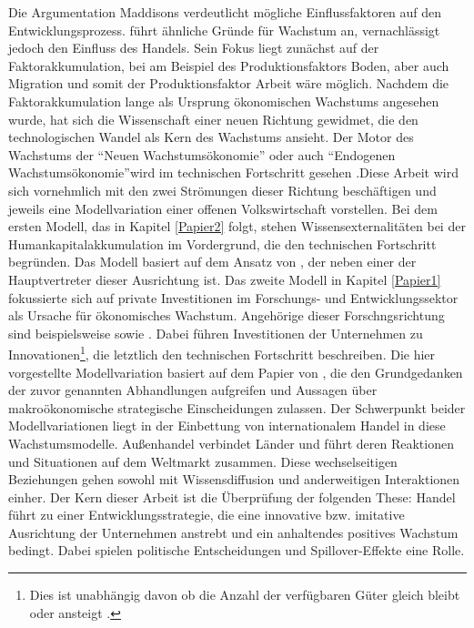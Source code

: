 Die Argumentation Maddisons verdeutlicht mögliche Einflussfaktoren auf den Entwicklungsprozess. \citet{Gandolfo.1998} führt ähnliche Gründe für Wachstum an, vernachlässigt jedoch den Einfluss des Handels. Sein Fokus liegt zunächst auf der Faktorakkumulation, bei \citet{Maddison.2001} am Beispiel des Produktionsfaktors Boden, aber auch Migration und somit der Produktionsfaktor Arbeit wäre möglich. Nachdem die Faktorakkumulation lange als Ursprung ökonomischen Wachstums angesehen wurde, hat sich die Wissenschaft einer neuen Richtung gewidmet, die den technologischen Wandel als Kern des Wachstums ansieht. Der Motor des Wachstums der "`Neuen Wachstumsökonomie"' oder auch "`Endogenen Wachstumsökonomie"'wird im technischen Fortschritt gesehen \citep{Gandolfo.1998,Maddison.2001}.\newline Diese Arbeit wird sich vornehmlich mit den zwei Strömungen dieser Richtung beschäftigen und jeweils eine Modellvariation einer offenen Volkswirtschaft vorstellen. \newline Bei dem ersten Modell, das in Kapitel \ref{Papier2} folgt, stehen Wissensexternalitäten bei der Humankapitalakkumulation im Vordergrund, die den technischen Fortschritt begründen. Das Modell basiert auf dem Ansatz von \citet{Lucas.1988}, der neben \citet{Romer.1990} einer der Hauptvertreter dieser Ausrichtung ist. \newline Das zweite Modell in Kapitel \ref{Papier1} fokussierte sich auf private Investitionen im Forschungs- und Entwicklungssektor als Ursache für ökonomisches Wachstum. Angehörige dieser Forschngsrichtung sind beispielsweise \citet{Romer.1990,Grossman.1991c} sowie \citet{Aghion.1992}. Dabei führen Investitionen der Unternehmen zu Innovationen\footnote{Dies ist unabhängig davon ob die Anzahl der verfügbaren Güter gleich bleibt \citep{Aghion.1992} oder ansteigt \citep{Romer.1990}.}, die letztlich den technischen Fortschritt beschreiben. Die hier vorgestellte Modellvariation basiert auf dem Papier von \citet{Acemoglu.2006}, die den Grundgedanken der zuvor genannten Abhandlungen aufgreifen und Aussagen über makroökonomische strategische Einscheidungen zulassen. \newline Der Schwerpunkt beider Modellvariationen liegt in der Einbettung von internationalem Handel in diese Wachstumsmodelle. Außenhandel verbindet Länder und führt deren Reaktionen und Situationen auf dem Weltmarkt zusammen. Diese wechselseitigen Beziehungen gehen sowohl mit Wissensdiffusion und anderweitigen Interaktionen einher. Der Kern dieser Arbeit ist die Überprüfung der folgenden These: Handel führt zu einer Entwicklungsstrategie, die eine innovative bzw. imitative Ausrichtung der Unternehmen anstrebt und ein anhaltendes positives Wachstum bedingt. Dabei spielen politische Entscheidungen und Spillover-Effekte eine Rolle.\\


